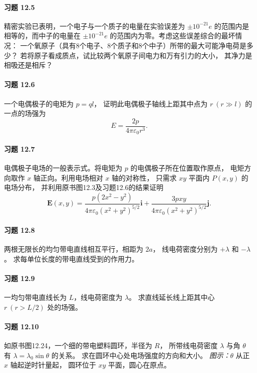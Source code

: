 \paragraph{习题 12.5}
精密实验已表明，一个电子与一个质子的电量在实验误差为
\(\pm10^{-21}e\) 的范围内是相等的，而中子的电量在
\(\pm10^{-21}e\) 的范围内为零。考虑这些误差综合的最坏情况：
一个氧原子（具有8个电子、8个质子和8个中子）所带的最大可能净电荷是多少？
若将原子看成质点，试比较两个氧原子间电力和万有引力的大小，
其净力是相吸还是相斥？

\paragraph{习题 12.6}
一个电偶极子的电矩为 \(p=ql\)，
证明此电偶极子轴线上距其中点为
\(r\ (r\gg l)\) 的一点的场强为
\[
 E=\frac{2p}{4\pi\varepsilon_0r^3}.
\]

\paragraph{习题 12.7}
电偶极子电场的一般表示式。将电矩为 \(p\) 的电偶极子所在位置取作原点，
电矩方向取作 \(x\) 轴正向。利用电场相对 \(x\) 轴的对称性，
只需求 \(xy\) 平面内 \(P(x,y)\) 的电场分布，
并利用原书图12.3及习题12.6的结果证明
\[
 \boldsymbol E(x,y)=
 \frac{p(2x^2-y^2)}{4\pi\varepsilon_0(x^2+y^2)^{5/2}}\boldsymbol i
 +\frac{3pxy}{4\pi\varepsilon_0(x^2+y^2)^{5/2}}\boldsymbol j.
\]

\paragraph{习题 12.8}
两根无限长的均匀带电直线相互平行，相距为 \(2a\)，
线电荷密度分别为 \(+\lambda\) 和 \(-\lambda\)。
求每单位长度的带电直线受到的作用力。

\paragraph{习题 12.9}
一均匀带电直线长为 \(L\)，线电荷密度为 \(\lambda\)。
求直线延长线上距其中心 \(r\ (r>L/2)\) 处的场强。

\paragraph{习题 12.10}
如原书图12.24，一个细的带电塑料圆环，半径为 \(R\)，
所带线电荷密度 \(\lambda\) 与角 \(\theta\) 有
\(\lambda=\lambda_0\sin\theta\) 的关系。
求在圆环中心处电场强度的方向和大小。
\textit{图示：}\(\theta\) 从正 \(x\) 轴起逆时针量起，
圆环位于 \(xy\) 平面，圆心在原点。

